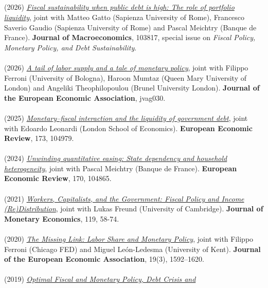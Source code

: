 \documentclass[margin, 11pt]{res} %
\begin{document}
\begin{resume}
\section{}
(2026) \emph{\href{https://doi.org/10.1016/j.jmacro.2026.103817}{Fiscal sustainability when public debt is high: The role of portfolio liquidity}}, joint with Matteo Gatto (Sapienza University of Rome), Francesco Saverio Gaudio (Sapienza University of Rome) and Pascal Meichtry (Banque de France).
\textbf{Journal of Macroeconomics}, 103817, special issue on \emph{Fiscal Policy, Monetary Policy, and Debt Sustainability}.\\
\\
(2026) \emph{\href{https://doi.org/10.1093/jeea/jvag030}{A tail of labor supply and a tale of monetary policy}}, joint with Filippo Ferroni (University of Bologna), Haroon Mumtaz (Queen Mary University of London) and Angeliki Theophilopoulou (Brunel University London).
\textbf{Journal of the European Economic Association}, jvag030.\\
\\
(2025) \emph{\href{https://www.sciencedirect.com/science/article/pii/S0014292125000297}{Monetary–fiscal interaction and the liquidity of government debt}}, joint with Edoardo Leonardi (London School of Economics).
\textbf{European Economic Review}, 173, 104979.\\
\\
(2024) \emph{\href{https://www.sciencedirect.com/science/article/pii/S0014292124001946?dgcid=author}{Unwinding quantitative easing: State dependency and household heterogeneity}}, joint with Pascal Meichtry (Banque de France).
\textbf{European Economic Review}, 170, 104865.\\
\\
(2021) \emph{\href{https://www.sciencedirect.com/science/article/abs/pii/S0304393221000040}{Workers, Capitalists, and the Government: Fiscal Policy and Income (Re)Distribution}}, joint with Lukas Freund (University of Cambridge).
\textbf{Journal of Monetary Economics}, 119, 58-74.\\
\\
(2020) \emph{\href{https://academic.oup.com/jeea/advance-article/doi/10.1093/jeea/jvaa034/5884931}{The Missing Link: Labor Share and Monetary Policy}}, joint with Filippo Ferroni (Chicago FED) and Miguel Le\'{o}n-Ledesma (University of Kent).
\textbf{Journal of the European Economic Association}, 19(3), 1592–1620.\\
\\
(2019) \emph{\href{https://www.cambridge.org/core/journals/macroeconomic-dynamics/article/optimal-fiscal-and-monetary-policy-debt-crisis-and-management/4E05CEF51FA691092B6EE52ACC807F5E}{Optimal Fiscal and Monetary Policy, Debt Crisis and
}}
\end{resume}
\end{document}
